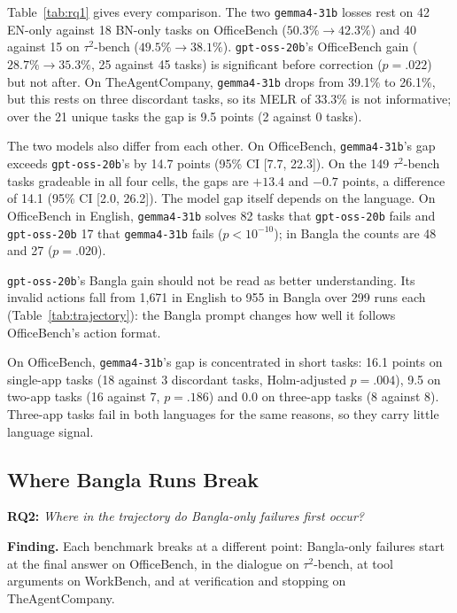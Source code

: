 \documentclass[11pt]{article}
\newcommand{\gemma}{\texttt{gemma4-31b}}
\newcommand{\gptoss}{\texttt{gpt-oss-20b}}
\newcommand{\OB}{OfficeBench}
\newcommand{\WB}{WorkBench}
\newcommand{\TAU}{$\tau^2$-bench}
\newcommand{\TAC}{TheAgentCompany}
\begin{document}
Table~\ref{tab:rq1} gives every comparison. The two \gemma{} losses rest on 42 EN-only against
18 BN-only tasks on \OB{} ($50.3\%\to42.3\%$) and 40 against 15 on \TAU{} ($49.5\%\to38.1\%$).
\gptoss{}'s \OB{} gain ($28.7\%\to35.3\%$, 25 against 45 tasks) is significant before correction
($p=.022$) but not after. On \TAC{}, \gemma{} drops from 39.1\% to 26.1\%,
but this rests on three discordant tasks, so its MELR of 33.3\% is not informative; over the 21
unique tasks the gap is 9.5 points (2 against 0 tasks).

The two models also differ from each other. On \OB{}, \gemma{}'s gap exceeds \gptoss{}'s by
14.7 points (95\% CI [7.7, 22.3]). On the 149 \TAU{} tasks gradeable in all four cells, the gaps
are $+13.4$ and $-0.7$ points, a difference of 14.1 (95\% CI [2.0, 26.2]). The model gap itself
depends on the language. On \OB{} in English, \gemma{} solves 82 tasks that \gptoss{} fails and
\gptoss{} 17 that \gemma{} fails ($p<10^{-10}$); in Bangla the counts are 48 and 27 ($p=.020$).

\gptoss{}'s Bangla gain should not be read as better understanding. Its invalid actions fall
from 1{,}671 in English to 955 in Bangla over 299 runs each (Table~\ref{tab:trajectory}): the
Bangla prompt changes how well it follows \OB{}'s action format.

On \OB{}, \gemma{}'s gap is concentrated in short tasks: 16.1 points on single-app tasks (18
against 3 discordant tasks, Holm-adjusted $p=.004$), 9.5 on two-app tasks (16 against 7,
$p=.186$) and 0.0 on three-app tasks (8 against 8). Three-app tasks fail in both languages for
the same reasons, so they carry little language signal.

\subsection{Where Bangla Runs Break}
\label{sec:rq2}

\noindent\textbf{RQ2:} \emph{Where in the trajectory do Bangla-only failures first occur?}

\noindent\textbf{Finding.} Each benchmark breaks at a different point: Bangla-only failures start
at the final answer on \OB{}, in the dialogue on \TAU{}, at tool arguments on \WB{}, and at
verification and stopping on \TAC{}.
\end{document}
